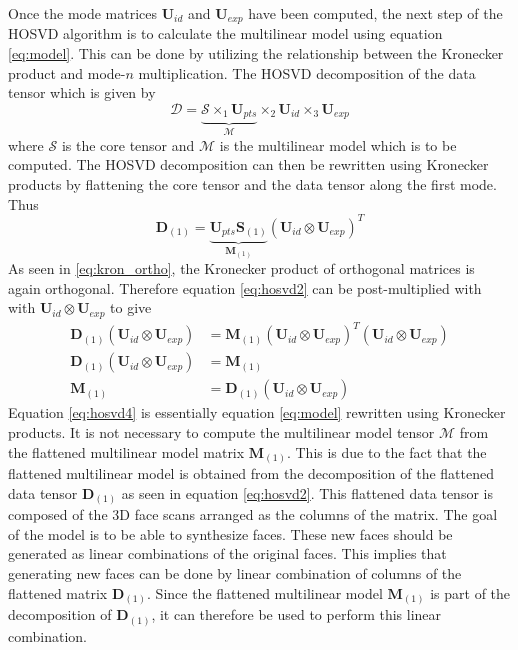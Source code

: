 \documentclass[11pt,a4paper,twoside]{report}
\begin{document}
Once the mode matrices $\mathbf{U}_{id}$ and $\mathbf{U}_{exp}$ have been
computed, the next step of the HOSVD algorithm is to calculate the multilinear model using equation
\ref{eq:model}. This can be done by utilizing the relationship between the
Kronecker product and mode-$n$ multiplication. The HOSVD
decomposition of the data tensor which is given by
\begin{equation}
\mathcal{D} = \underbrace{\mathcal{S} \times_1 \mathbf{U}_{pts}}_{\mathcal{M}} \times_2 \mathbf{U}_{id} \times_3 \mathbf{U}_{exp}
\end{equation}
where $\mathcal{S}$ is the core tensor and $\mathcal{M}$ is the multilinear
model which is to be computed. The HOSVD decomposition can then be
rewritten using Kronecker products by flattening the core tensor and the data
tensor along the first mode. Thus 
\begin{equation}\label{eq:hosvd2}
\mathbf{D}_{(1)} = \underbrace{\mathbf{U}_{pts}\mathbf{S}_{(1)}}_{\mathbf{M}_{(1)}} (\mathbf{U}_{id} \otimes \mathbf{U}_{exp})^T
\end{equation}
As seen in \ref{eq:kron_ortho}, the Kronecker product of orthogonal matrices is
again orthogonal. Therefore equation \ref{eq:hosvd2} can be post-multiplied with
with $\mathbf{U}_{id} \otimes \mathbf{U}_{exp}$ to give
\begin{align}
\mathbf{D}_{(1)} (\mathbf{U}_{id} \otimes \mathbf{U}_{exp}) &= \mathbf{M}_{(1)}
(\mathbf{U}_{id} \otimes \mathbf{U}_{exp})^T (\mathbf{U}_{id} \otimes
\mathbf{U}_{exp})\nonumber\\
\mathbf{D}_{(1)} (\mathbf{U}_{id} \otimes \mathbf{U}_{exp}) &=
\mathbf{M}_{(1)}\nonumber\\
\label{eq:hosvd4}
\mathbf{M}_{(1)} &= \mathbf{D}_{(1)} (\mathbf{U}_{id} \otimes \mathbf{U}_{exp})
\end{align}
Equation \ref{eq:hosvd4} is essentially equation \ref{eq:model} rewritten using Kronecker
products. It is not necessary to compute the
multilinear model tensor $\mathcal{M}$ from the flattened multilinear
model matrix $\mathbf{M}_{(1)}$. This is due to the fact that the flattened multilinear
model is obtained from the decomposition of the flattened data tensor
$\mathbf{D}_{(1)}$ as seen in equation \ref{eq:hosvd2}. This flattened data
tensor is composed of the 3D face scans arranged as the columns of the
matrix. The goal of the model is to be able to synthesize faces. These new faces
should be generated as linear combinations of the
original faces. This implies that generating new faces can be done by linear
combination of columns of the flattened matrix $\mathbf{D}_{(1)}$. Since the
flattened multilinear model $\mathbf{M}_{(1)}$ is part of the decomposition of
$\mathbf{D}_{(1)}$, it can therefore be used to perform this
linear combination.
\end{document}
